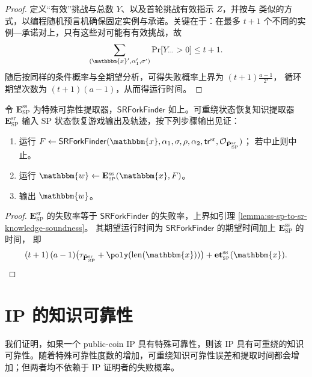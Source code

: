 \documentclass[american,singlepageview]{snargs-book-zh}
\newcommand{\Malicious}[1]{\tilde{#1}}
\newcommand{\BlackBox}[1]{\mathcal{O}_{#1}}
\newcommand{\BitSize}[1]{\mathrm{len}(#1)}
\newcommand{\Instance}{\mathbbm{x}}
\newcommand{\Witness}{\mathbbm{w}}
\newcommand{\ProtoProver}{P}
\newcommand{\ProtoExtractor}{E}
\newcommand{\ProtoKnowledgeTime}{\mathbf{et}}
\newcommand{\ProtoRandomnessComplexity}{\mathsf{r}}
\newcommand{\SRSuperscript}{\mathrm{sr}}
\newcommand{\SPSubscript}{\scriptscriptstyle\mathrm{SP}}
\newcommand{\SPFormat}[1]{\mathbf{#1}}
\newcommand{\SPExtractor}{\SPFormat{\ProtoExtractor}_{\SPSubscript}}
\newcommand{\SPMaliciousProver}{\Malicious{\SPFormat{\ProtoProver}}_{\SPSubscript}}
\newcommand{\SPCommitment}{\alpha_{1}}
\newcommand{\SPChallenge}{\rho}
\newcommand{\SPResponse}{\alpha_{2}}
\newcommand{\SPRandomnessCardinality}{2^{\ProtoRandomnessComplexity}}
\newcommand{\ProverRunningTime}[1]{\tau_{#1}}
\newcommand{\ROTrace}{\mathsf{tr}}
\newcommand{\SRBudget}{t}
\newcommand{\SRSaltString}{\sigma}
\newcommand{\SRTrace}{\ROTrace^{\SRSuperscript}}
\newcommand{\SPSRExtractor}{\SPExtractor^{\SRSuperscript}}
\newcommand{\SPMaliciousSRProver}{\SPMaliciousProver^{\SRSuperscript}}
\newcommand{\SSSuperscript}{\mathrm{ss}}
\newcommand{\SSArity}{a}
\newcommand{\SSFork}{F}
\newcommand{\SPSSExtractor}{\SPExtractor^{\SSSuperscript}}
\newcommand{\SPSSKnowledgeTime}{\ProtoKnowledgeTime_{\SPSubscript}^{\SSSuperscript}}
\newcommand{\SSSRForkFinder}{\mathsf{SRForkFinder}}
\newcommand{\SSGoodChallengeNumber}{Y}
\newcommand{\SSFinderHasFound}{Z}
\begin{document}
\begin{proof}
定义“有效”挑战与总数 $\SSGoodChallengeNumber$、以及首轮挑战有效指示 $\SSFinderHasFound$，并按与  类似的方式，以编程随机预言机确保固定实例与承诺。关键在于：在最多 $\SRBudget+1$ 个不同的实例—承诺对上，只有这些对可能有有效挑战，故
\[
  \sum_{(\Instance',\SPCommitment',\SRSaltString')}
  \Pr[\SSGoodChallengeNumber_{\cdots}>0]
  \le\SRBudget+1.
\]
随后按同样的条件概率与全期望分析，可得失败概率上界为
$(\SRBudget+1)\frac{\SSArity-1}{\SPRandomnessCardinality}$，
循环期望次数为 $(\SRBudget+1)(\SSArity-1)$，从而得运行时间。
\end{proof}

\begin{construction}
\label{construction:ss-sr-extractor-for-sp}
令 $\SPSSExtractor$ 为特殊可靠性提取器，$\SSSRForkFinder$ 如上。可重绕状态恢复知识提取器 $\SPSRExtractor$ 输入 SP 状态恢复游戏输出及轨迹，按下列步骤输出见证：
\begin{enumerate}[nolistsep]
  \item 运行
    $\SSFork\gets\SSSRForkFinder(\Instance,\SPCommitment,\SRSaltString,\SPChallenge,\SPResponse,\SRTrace,\BlackBox{\SPMaliciousSRProver})$；
    若中止则中止。
  \item 运行 $\Witness\gets\SPSSExtractor(\Instance,\SSFork)$。
  \item 输出 $\Witness$。
\end{enumerate}
\end{construction}

\begin{proof}
$\SPSRExtractor$ 的失败率等于 $\SSSRForkFinder$ 的失败率，上界如引理 \ref{lemma:ss-sp-to-sr-knowledge-soundness}。
其期望运行时间为 $\SSSRForkFinder$ 的期望时间加上 $\SPSSExtractor$ 的时间，
即
\[
  (\SRBudget+1)\,(\SSArity-1)\bigl(\ProverRunningTime{\SPMaliciousSRProver}+\poly(\BitSize{\Instance})\bigr)
  +\SPSSKnowledgeTime(\Instance).
\]
\end{proof}

\section{IP 的知识可靠性}
\label{section:ss-to-knowledge-soundness}

我们证明，如果一个 public-coin IP 具有特殊可靠性，则该 IP 具有可重绕的知识可靠性。随着特殊可靠性度数的增加，可重绕知识可靠性误差和提取时间都会增加；但两者均不依赖于 IP 证明者的失败概率。
\end{document}
